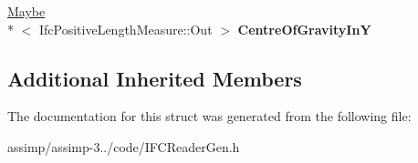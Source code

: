 \begin{DoxyCompactItemize}
\item 
\hypertarget{struct_assimp_1_1_i_f_c_1_1_ifc_l_shape_profile_def_a76863e0cd7f35ecbfb7ae1094f2770b7}{\hyperlink{struct_assimp_1_1_s_t_e_p_1_1_maybe}{Maybe}\\*
$<$ Ifc\+Positive\+Length\+Measure\+::\+Out $>$ {\bfseries Centre\+Of\+Gravity\+In\+Y}}\label{struct_assimp_1_1_i_f_c_1_1_ifc_l_shape_profile_def_a76863e0cd7f35ecbfb7ae1094f2770b7}

\end{DoxyCompactItemize}
\subsection*{Additional Inherited Members}


The documentation for this struct was generated from the following file\+:\begin{DoxyCompactItemize}
\item 
assimp/assimp-\/3../code/I\+F\+C\+Reader\+Gen.\+h\end{DoxyCompactItemize}
